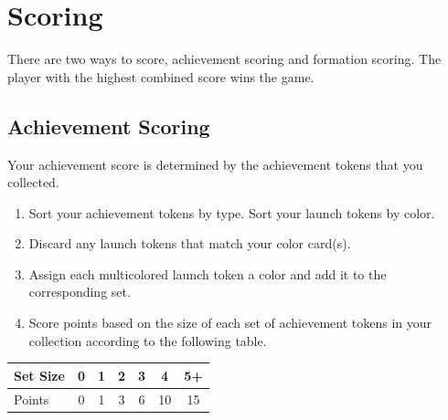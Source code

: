\documentclass[a6paper, 11pt, parskip=half, DIV=15]{scrartcl}
\begin{document}
\section*{Scoring}

There are two ways to score, achievement scoring and formation scoring. The player with the highest combined score wins the game.

\subsection*{Achievement Scoring}
Your achievement score is determined by the achievement tokens that you collected.

\begin{enumerate}
	\item Sort your achievement tokens by type. Sort your launch tokens by color.
	\item Discard any launch tokens that match your color card(s).
	\item Assign each multicolored launch token a color and add it to the corresponding set.
	\item Score points based on the size of each set of achievement tokens in your collection according to the following table.
\end{enumerate}
	\begin{center}
	\begin{tabular}{lcccccc}\toprule
	Set Size & 0 & 1 & 2 & 3 & 4 & 5+ \\\midrule
	Points & 0 & 1 & 3 & 6 & 10 & 15\phantom{0} \\\bottomrule
	\end{tabular}
	\end{center}

\end{document}
